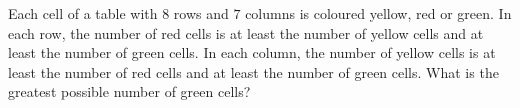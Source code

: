 Each cell of a table with $8$ rows and $7$ columns is coloured yellow, red or green. In each row, the number of red cells is at least the number of yellow cells and at least the number of green cells. In each column, the number of yellow cells is at least the number of red cells and at least the number of green cells. What is the greatest possible number of green cells?
